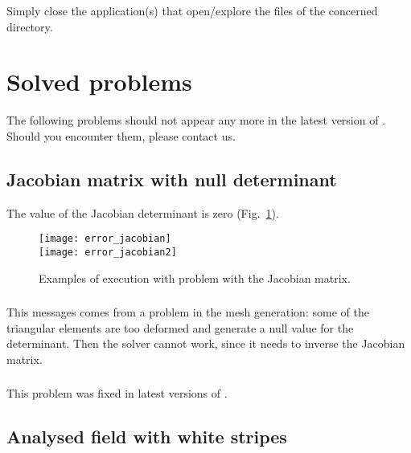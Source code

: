Simply close the application(s) that open/explore the files of the concerned directory.


\section{Solved problems}


The following problems should not appear any more in the latest version of \diva. Should you encounter them, please contact us.


\subsection{Jacobian matrix with null determinant}

The value of the Jacobian determinant is zero (Fig.~\ref{fig:error_jacobian}).
\begin{figure}[htpb]
\centering
\texttt{[image: error\_jacobian]}\\
\texttt{[image: error\_jacobian2]}
\caption{Examples of \diva execution with problem with the Jacobian matrix. \label{fig:error_jacobian}}
\end{figure}

\subsubsection{\question}

This messages comes from a problem in the mesh generation: some of the triangular elements are too deformed and generate a null value for the determinant. Then the solver cannot work, since it needs to inverse the Jacobian matrix.


\subsubsection{\answer}

This problem was fixed in latest versions of \diva. 



\subsection{Analysed field with white stripes}

